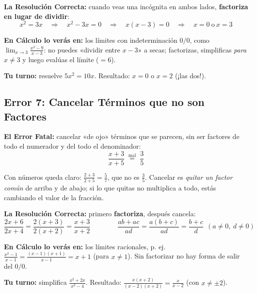 \documentclass[12pt, letterpaper]{article}
\begin{document}
\begin{cuadrosolucion}
  \textbf{La Resolución Correcta:} cuando veas una incógnita en ambos lados, \textbf{factoriza en lugar de dividir}:
  \[
    x^2 = 3x \quad \Rightarrow \quad x^2 - 3x = 0 \quad \Rightarrow \quad x(x - 3) = 0 \quad \Rightarrow \quad x = 0 \ \text{o} \ x = 3
  \]
\end{cuadrosolucion}

\noindent\textbf{En Cálculo lo verás en:} los límites con indeterminación $0/0$, como $\lim_{x \to 3} \frac{x^2 - 9}{x - 3}$: no puedes «dividir entre $x - 3$» a secas; factorizas, simplificas \emph{para $x \neq 3$} y luego evalúas el límite ($= 6$).

\noindent\textbf{Tu turno:} resuelve $5x^2 = 10x$. Resultado: $x = 0$ o $x = 2$ (¡las dos!).

\newpage

\subsection{Error 7: Cancelar Términos que no son Factores}

\begin{cuadroadvertencia}
  \textbf{El Error Fatal:} cancelar «de ojo» términos que se parecen, sin ser factores de todo el numerador y del todo el denominador:
  \[
    \frac{x + 3}{x + 5} \;\overset{\text{mal}}{=}\; \frac{3}{5}
  \]
\end{cuadroadvertencia}

Con números queda claro: $\frac{2 + 3}{2 + 5} = \frac{5}{7}$, que no es $\frac{3}{5}$. Cancelar es \emph{quitar un factor común} de arriba y de abajo; si lo que quitas no multiplica a todo, estás cambiando el valor de la fracción.

\begin{cuadrosolucion}
  \textbf{La Resolución Correcta:} primero \textbf{factoriza}, después cancela:
  \[
    \frac{2x + 6}{2x + 4} = \frac{2(x + 3)}{2(x + 2)} = \frac{x + 3}{x + 2}
    \qquad\qquad
    \frac{ab + ac}{ad} = \frac{a(b + c)}{ad} = \frac{b + c}{d} \ \ (a \neq 0, \ d \neq 0)
  \]
\end{cuadrosolucion}

\noindent\textbf{En Cálculo lo verás en:} los límites racionales, p. ej. $\frac{x^2 - 1}{x - 1} = \frac{(x - 1)(x + 1)}{x - 1} = x + 1$ (para $x \neq 1$). Sin factorizar no hay forma de salir del $0/0$.

\noindent\textbf{Tu turno:} simplifica $\frac{x^2 + 2x}{x^2 - 4}$. Resultado: $\frac{x(x+2)}{(x-2)(x+2)} = \frac{x}{x - 2}$ (con $x \neq \pm 2$).
\end{document}
